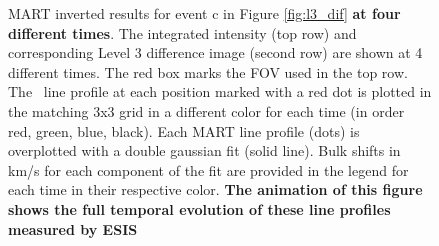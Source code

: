   
    	\begin{figure}
    		\caption{MART inverted results for event c in Figure \ref{fig:l3_dif} \textbf{at four different times}. 
    			The integrated intensity (top row) and corresponding Level 3 difference image (second row) are shown at 4 different times. The red box marks the FOV used in the top row.  
    			The \ov \ line profile at each position marked with a red dot is plotted in the matching 3x3 grid in a different color for each time (in order red, green, blue, black). 
    			Each MART line profile (dots) is overplotted with a double gaussian fit (solid line).  
    			Bulk shifts in km/s for each component of the fit are provided in the legend for each time in their respective color. 
    			\textbf{The animation of this figure shows the full temporal evolution of these line profiles measured by ESIS}    		
    		}
    		\label{fig:perfect_x_inverted}
    	\end{figure}
    

